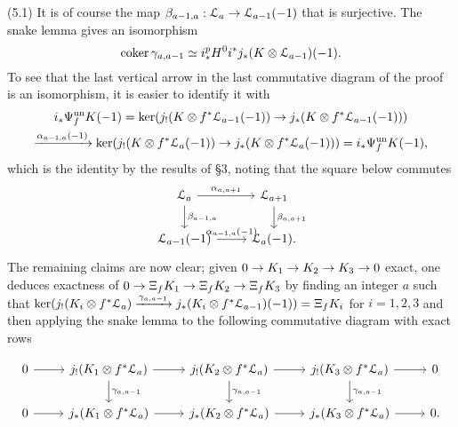 \documentclass[deligne.tex]{subfiles}
\begin{document}
(5.1) It is of course the map
$\beta_{a-1,a}:\mathcal L_a\rightarrow\mathcal L_{a-1}(-1)$
that is surjective. The snake lemma gives an isomorphism
\begin{equation*}
	\operatorname{coker}\gamma_{a,a-1}\simeq i_* ^pH^0i^*j_*(K\otimes\mathcal L_{a-1})(-1).
\end{equation*}
To see that the last vertical arrow in the last commutative diagram of the 
proof is an isomorphism, it is easier to identify it with
\begin{multline*}
	i_*\Psi_f^{\mathrm{un}}K(-1)
	=\ker(j_!(K\otimes f^*\mathcal L_{a-1}(-1))\rightarrow j_*(K\otimes f^*\mathcal L_{a-1}(-1))) \\
	\xrightarrow{\alpha_{a-1,a}(-1)}
	\ker(j_!(K\otimes f^*\mathcal L_a(-1))\rightarrow j_*(K\otimes f^*\mathcal L_a(-1)))
	=i_*\Psi_f^{\mathrm{un}}K(-1),
\end{multline*}
which is the identity by the results of \S3, noting that the square below
commutes
\begin{equation*}\begin{tikzcd}
	\mathcal L_a\arrow[r,"\alpha_{a,a+1}"]\arrow[d,"\beta_{a-1,a}"]
	&\mathcal L_{a+1}\arrow[d,"\beta_{a,a+1}"] \\
	\mathcal L_{a-1}(-1)\arrow[r,"\alpha_{a-1,a}(-1)"]
	&\mathcal L_a(-1).
\end{tikzcd}\end{equation*}
The remaining claims are now clear; given
$0\rightarrow K_1\rightarrow K_2\rightarrow K_3\rightarrow0$ exact, one deduces exactness of
$0\rightarrow \Xi_fK_1\rightarrow \Xi_fK_2\rightarrow \Xi_fK_3$ by finding an integer $a$ such that
$\ker(j_!(K_i\otimes f^*\mathcal L_a)\xrightarrow{\gamma_{a,a-1}}j_*(K_i\otimes f^*\mathcal L_{a-1})(-1))=\Xi_f K_i$ for $i=1,2,3$ and then applying the
snake lemma to the following commutative diagram with exact rows
\begin{ceqn}\begin{equation*}\begin{tikzcd}
	0\arrow[r]
	&j_!(K_1\otimes f^*\mathcal L_a)\arrow[r]\arrow[d,"\gamma_{a,a-1}"]
	&j_!(K_2\otimes f^*\mathcal L_a)\arrow[r]\arrow[d,"\gamma_{a,a-1}"]
	&j_!(K_3\otimes f^*\mathcal L_a)\arrow[r]\arrow[d,"\gamma_{a,a-1}"]
	&0 \\
	0\arrow[r]
	&j_*(K_1\otimes f^*\mathcal L_a)\arrow[r]
	&j_*(K_2\otimes f^*\mathcal L_a)\arrow[r]
	&j_*(K_3\otimes f^*\mathcal L_a)\arrow[r]
	&0.
\end{tikzcd}\end{equation*}\end{ceqn}
\end{document}

